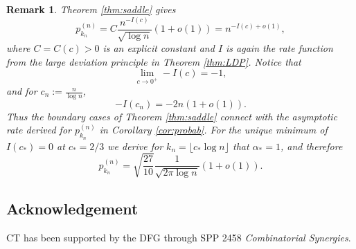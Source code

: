 \documentclass[11pt,a4paper]{article}
\numberwithin{equation}{section}
\newtheorem {remark}[theorem]{Remark}
\begin{document}
\begin{remark}
Theorem \ref{thm:saddle} gives
\begin{equation*}
    p_{k_n}^{(n)} =
        C\frac{n^{-I(c)}}{\sqrt{\log n}} (1+o(1)) 
    = n^{-I(c)+o(1)},
\end{equation*}
where $C=C(c)>0$ is an explicit constant and $I$ is again the rate function from the large deviation principle in Theorem \ref{thm:LDP}.
Notice that
\begin{equation*}
    \lim_{c\to 0^+} -I(c) = -1,
\end{equation*}
and for $c_n:=\frac{n}{\log n}$,
\begin{equation*}
    -I(c_n) = -2n (1+o(1)).
\end{equation*}
Thus the boundary cases of Theorem \ref{thm:saddle} connect with the asymptotic rate derived for $p_{k_n}^{(n)}$ in Corollary \ref{cor:probab}.
For the unique minimum of $I(c_*)=0$ at $c_*=2/3$ we derive for $k_n=\lfloor c_*\log n\rfloor$ that
$\alpha_*=1$, and therefore
\begin{equation*}
    p_{k_n}^{(n)} = \sqrt{\frac{27}{10}} \frac{1}{\sqrt{2\pi \log n}} (1+o(1)).
\end{equation*}
\end{remark}


\subsection*{Acknowledgement}
CT has been supported by the DFG through SPP 2458 \textit{Combinatorial Synergies}.





\end{document}
